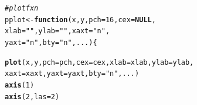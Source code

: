 \documentclass{article}\usepackage[]{graphicx}\usepackage[]{color}
\makeatletter
\newcommand{\hlnum}[1]{\textcolor[rgb]{0.686,0.059,0.569}{#1}}%
\newcommand{\hlstr}[1]{\textcolor[rgb]{0.192,0.494,0.8}{#1}}%
\newcommand{\hlcom}[1]{\textcolor[rgb]{0.678,0.584,0.686}{\textit{#1}}}%
\newcommand{\hlstd}[1]{\textcolor[rgb]{0.345,0.345,0.345}{#1}}%
\newcommand{\hlkwa}[1]{\textcolor[rgb]{0.161,0.373,0.58}{\textbf{#1}}}%
\newcommand{\hlkwb}[1]{\textcolor[rgb]{0.69,0.353,0.396}{#1}}%
\newcommand{\hlkwc}[1]{\textcolor[rgb]{0.333,0.667,0.333}{#1}}%
\newcommand{\hlkwd}[1]{\textcolor[rgb]{0.737,0.353,0.396}{\textbf{#1}}}%
\newenvironment{kframe}{%
 \def\at@end@of@kframe{}%
 \ifinner\ifhmode%
  \def\at@end@of@kframe{\end{minipage}}%
  \begin{minipage}{\columnwidth}%
 \fi\fi%
 \def\FrameCommand##1{\hskip\@totalleftmargin \hskip-\fboxsep
 \colorbox{shadecolor}{##1}\hskip-\fboxsep
     \hskip-\linewidth \hskip-\@totalleftmargin \hskip\columnwidth}%
 \MakeFramed {\advance\hsize-\width
   \@totalleftmargin\z@ \linewidth\hsize
   \@setminipage}}%
 {\par\unskip\endMakeFramed%
 \at@end@of@kframe}
\newenvironment{knitrout}{}{} %
\makeatother
\begin{document}
\begin{knitrout}
\color{fgcolor}\begin{kframe}
\begin{alltt}
\hlcom{#plot fxn}
\hlstd{pplot} \hlkwb{<-} \hlkwa{function}\hlstd{(}\hlkwc{x}\hlstd{,} \hlkwc{y}\hlstd{,} \hlkwc{pch} \hlstd{=} \hlnum{16}\hlstd{,} \hlkwc{cex} \hlstd{=} \hlkwa{NULL}\hlstd{,}
                  \hlkwc{xlab} \hlstd{=} \hlstr{""}\hlstd{,} \hlkwc{ylab} \hlstd{=} \hlstr{""}\hlstd{,} \hlkwc{xaxt} \hlstd{=} \hlstr{"n"}\hlstd{,}
                  \hlkwc{yaxt} \hlstd{=} \hlstr{"n"}\hlstd{,} \hlkwc{bty} \hlstd{=} \hlstr{"n"}\hlstd{,} \hlkwc{...}\hlstd{) \{}

  \hlkwd{plot}\hlstd{(x, y,} \hlkwc{pch} \hlstd{= pch,} \hlkwc{cex} \hlstd{= cex,} \hlkwc{xlab} \hlstd{= xlab,} \hlkwc{ylab} \hlstd{= ylab,}
       \hlkwc{xaxt} \hlstd{= xaxt,} \hlkwc{yaxt} \hlstd{= yaxt,} \hlkwc{bty} \hlstd{=} \hlstr{"n"}\hlstd{,...)}
  \hlkwd{axis}\hlstd{(}\hlnum{1}\hlstd{)}
  \hlkwd{axis}\hlstd{(}\hlnum{2}\hlstd{,} \hlkwc{las} \hlstd{=} \hlnum{2}\hlstd{)}


\end{alltt}
\end{kframe}
\end{knitrout}
\end{document}

